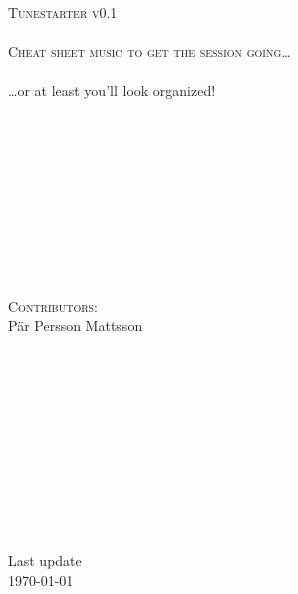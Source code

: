 \begin{titlepage}
\begin{center}
~\\
~\\
~\\
~\\
\normalsize
~\\
~\\
~\\
~\\
~\\
~\\
~\\
~\\
~\\
\Huge
\textsc{ Tunestarter v0.1 \\ }
~\\
\Large
\textsc{
Cheat sheet music to get the session going\ldots \\
}
~\\
\normalsize
\ldots or at least you'll look organized!
~\\
~\\
~\\
~\\
~\\
~\\
~\\
~\\
~\\
~\\
~\\
\normalsize
\textsc{
Contributors:
}\\
Pär Persson Mattsson\\
~\\
~\\
~\\
~\\
~\\
~\\
~\\
~\\
~\\
~\\
~\\
Last update\\
\today{}

\end{center}
\end{titlepage}

